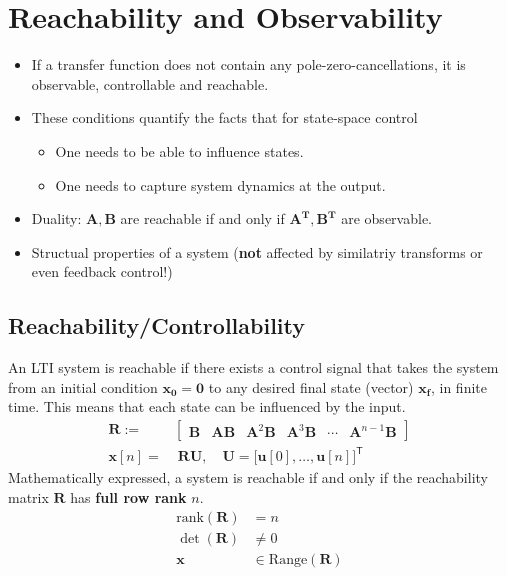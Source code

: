 \section{Reachability and Observability}
\begin{itemize}
    \item If a transfer function does not contain any pole-zero-cancellations, it is observable, controllable and reachable.
    \item These conditions quantify the facts that for state-space control
          \begin{itemize}
              \item One needs to be able to influence states.
              \item One needs to capture system dynamics at the output.
          \end{itemize}
    \item Duality: $\mathbf{A},\mathbf{B}$ are reachable if and only if $\mathbf{A^T}, \mathbf{B^T}$ are observable.
    \item Structual properties of a system (\textbf{not} affected by similatriy transforms or even feedback control!)
\end{itemize}

\subsection{Reachability/Controllability}

An LTI system is reachable if there exists a control signal that takes the system from an initial condition $\mathbf{x_0} = \mathbf{0}$ to any desired final state (vector) $\mathbf{x_f}$, in finite time. This means that each state can be influenced by the input.
\noindent\begin{align*}
    \mathbf{R} :=   & \begin{bmatrix}
                          \mathbf{B} & \mathbf{AB} & \mathbf{A}^2\mathbf{B} & \mathbf{A}^3\mathbf{B} & \cdots & \mathbf{A}^{n-1}\mathbf{B}
                      \end{bmatrix} \\
    \mathbf{x}[n] = & \; \mathbf{RU},\quad \mathbf{U}={\bigl[\mathbf{u}[0],\ldots, \mathbf{u}[n]\bigr]}^{\mathsf{T}}
\end{align*}
Mathematically expressed, a system is reachable if and only if the reachability matrix $\mathbf{R}$ has \textbf{full row rank} $n$.
\begin{align*}
    \text{rank}(\mathbf{R}) & = n                            \\
    \det(\mathbf{R})        & \neq 0                         \\
    \mathbf{\mathbf{x}}     & \in \mathrm{Range}(\mathbf{R})
\end{align*}


